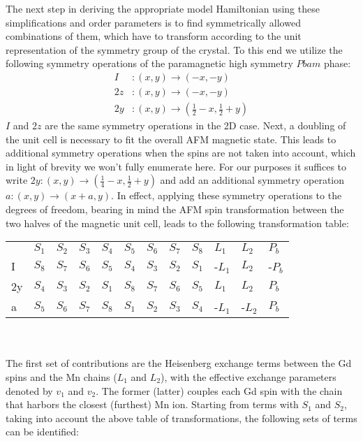 The next step in deriving the appropriate model Hamiltonian using these simplifications and order parameters is to find symmetrically allowed combinations of them, which have to transform according to the unit representation of the symmetry group of the crystal.
To this end we utilize the following symmetry operations of the paramagnetic high symmetry $Pbam$ phase:
\begin{align}
	I &: (x, y) \rightarrow (-x, -y)\\
	2z &: (x, y) \rightarrow (-x, -y)\\
	2y &: (x, y) \rightarrow (\frac{1}{2} - x, \frac{1}{2} + y)
\end{align}
$I$ and $2z$ are the same symmetry operations in the 2D case. Next, a doubling of the unit cell is necessary to fit the overall AFM magnetic state. This leads to additional symmetry operations when the spins are not taken into account, which in light of brevity we won't fully enumerate here. For our purposes it suffices to write $2y: (x, y) \rightarrow (\frac{1}{4} - x, \frac{1}{2}+y)$ and add an additional symmetry operation $a: (x, y) \rightarrow (x + a, y)$.
In effect, applying these symmetry operations to the degrees of freedom, bearing in mind the AFM spin transformation between the two halves of the magnetic unit cell, leads to the following transformation table:
\begin{table}[h]
\begin{tabular}{|l|lllllllllll|}
\cline{1-12}
 & $S_1$ & $S_2$ & $S_3$ & $S_4$ & $S_5$ & $S_6$ & $S_7$ & $S_8$ & $L_1$ & $L_2$ & $P_b$ \\ \cline{1-12}
I & $S_8$ & $S_7$ & $S_6$ & $S_5$ & $S_4$ & $S_3$ & $S_2$ & $S_1$ & -$L_1$ & $L_2$ & -$P_b$ \\ \cline{1-12}
2y & $S_4$ & $S_3$ & $S_2$ & $S_1$ & $S_8$ & $S_7$ & $S_6$ & $S_5$ & $L_1$ & $L_2$ & $P_b$ \\ \cline{1-12}
a & $S_5$ & $S_6$ & $S_7$ & $S_8$ & $S_1$ & $S_2$ & $S_3$ & $S_4$ & -$L_1$ & -$L_2$ & $P_b$ \\ \cline{1-12}
\end{tabular}
\end{table}\\\\
The first set of contributions are the Heisenberg exchange terms between the Gd spins and the Mn chains ($L_1$ and $L_2$), with the effective exchange parameters denoted by $v_1$ and $v_2$.
The former (latter) couples each Gd spin with the chain that harbors the closest (furthest) Mn ion.
Starting from terms with $S_1$ and $S_2$, taking into account the above table of transformations, the following sets of terms can be identified:
